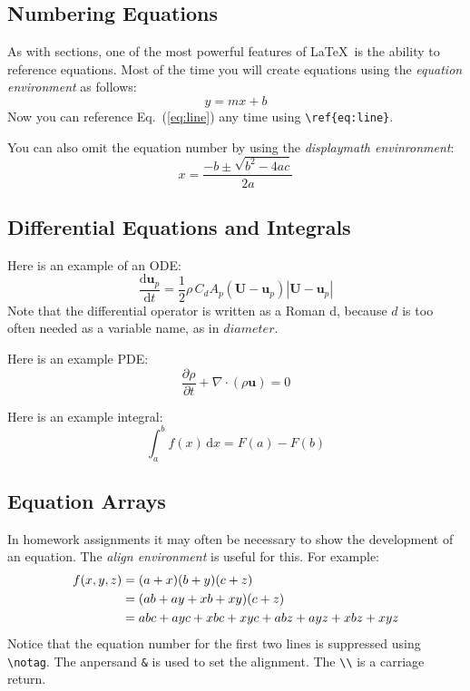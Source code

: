 \documentclass[12pt,letterpaper]{article}
\renewcommand{\d}{\mathrm{d}}
\begin{document}
\subsection{Numbering Equations}

As with sections, one of the most powerful features of \LaTeX~is the ability to reference equations.  Most of the time you will create equations using the \emph{equation environment} as follows:
\begin{equation}
\label{eq:line}
y = mx + b
\end{equation}
Now you can reference Eq.~(\ref{eq:line}) any time using \verb/\ref{eq:line}/.

You can also omit the equation number by using the \emph{displaymath envinronment}:
\begin{displaymath}
x = \frac{-b \pm \sqrt{b^2-4ac}}{2a}
\end{displaymath}

\subsection{Differential Equations and Integrals}

Here is an example of an ODE:
\begin{equation}
\label{eq:ode}
\frac{\d \mathbf{u}_p}{\d t} = \frac{1}{2}\rho\,C_d A_p (\mathbf{U}-\mathbf{u}_p)|\mathbf{U}-\mathbf{u}_p|
\end{equation}
Note that the differential operator is written as a Roman d, because $d$ is too often needed as a variable name, as in $diameter$.

Here is an example PDE:
\begin{equation}
\label{eq:pde}
\frac{\partial \rho}{\partial t} + \nabla\!\cdot(\rho \mathbf{u}) = 0
\end{equation}

Here is an example integral:
\begin{equation}
\label{eq:filter}
\int_a^b f(x) \,\d x = F(a) - F(b)
\end{equation}

\subsection{Equation Arrays}
In homework assignments it may often be necessary to show the development of an equation.  The \emph{align environment} is useful for this.  For example:
\begin{align}
f(x,y,z) &= (a + x)(b + y)(c + z) \notag\\
         &= (ab + ay + xb + xy)(c + z) \notag\\
         &= abc + ayc + xbc + xyc + abz + ayz + xbz + xyz
\end{align}
Notice that the equation number for the first two lines is suppressed using \verb/\notag/.  The anpersand \verb/&/ is used to set the alignment.  The \verb/\\/ is a carriage return.
\end{document}
